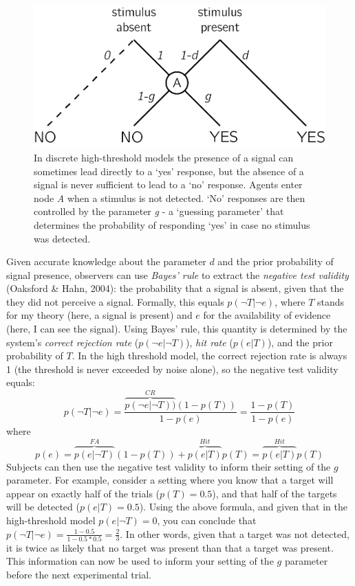 \documentclass[12pt,twoside]{reedthesis}
\begin{document}
\begin{figure}
\includegraphics[width=0.7\linewidth]{figure/intro/htm} \caption[The high threshold model]{In discrete high-threshold models the presence of a signal can sometimes lead directly to a `yes' response, but the absence of a signal is never sufficient to lead to a `no' response. Agents enter node \emph{A} when a stimulus is not detected. `No' responses are then controlled by the parameter \emph{g} - a `guessing parameter' that determines the probability of responding `yes' in case no stimulus was detected.}\label{fig:intro-htm}
\end{figure}
Given accurate knowledge about the parameter \(d\) and the prior probability of signal presence, observers can use \emph{Bayes' rule} to extract the \emph{negative test validity} (Oaksford \& Hahn, 2004): the probability that a signal is absent, given that the they did not perceive a signal. Formally, this equals \(p(\neg T|\neg e)\), where \(T\) stands for my theory (here, a signal is present) and \(e\) for the availability of evidence (here, I can see the signal). Using Bayes' rule, this quantity is determined by the system's \emph{correct rejection rate} (\(p(\neg e|\neg T)\)), \emph{hit rate} (\(p(e|T)\)), and the prior probability of \(T\). In the high threshold model, the correct rejection rate is always 1 (the threshold is never exceeded by noise alone), so the negative test validity equals:
\begin{equation}
p(\neg T|\neg e)=\frac{\overbrace{p(\neg e|\neg T))}^{CR}(1-p(T))}{1-p(e)} = \frac{1-p(T)}{1-p(e)}
\end{equation}
where
\begin{equation}
p(e)=\overbrace{p(e|\neg T)}^{FA}(1-p(T))+\overbrace{p(e|T)}^{Hit}p(T) = \overbrace{p(e|T)}^{Hit}p(T)
\end{equation}
Subjects can then use the negative test validity to inform their setting of the \(g\) parameter. For example, consider a setting where you know that a target will appear on exactly half of the trials (\(p(T)=0.5\)), and that half of the targets will be detected (\(p(e|T)=0.5\)). Using the above formula, and given that in the high-threshold model \(p(e|\neg T)=0\), you can conclude that \(p(\neg T|\neg e)=\frac{1-0.5}{1-0.5*0.5}=\frac{2}{3}\). In other words, given that a target was not detected, it is twice as likely that no target was present than that a target was present. This information can now be used to inform your setting of the \(g\) parameter before the next experimental trial.
\end{document}
